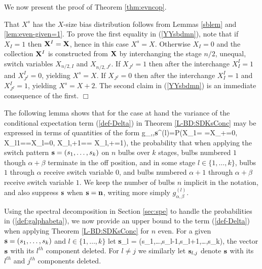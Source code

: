 \documentclass[10pt, amstex]{article}
\newcommand{\bbox}{\hfill $\Box$}
\begin{document}
We now present the proof of Theorem \ref{thm:evncop}.


\noindent \proof  That $X^s$ has the $X$-size bias distribution follows from Lemmas \ref{sblem} and \ref{lem:even-given=1}.
To prove the first equality in (\ref{YYsbdmn}), note that if $X_I=1$ then ${\bf X}^I={\bf X}$, hence in this case $X^s=X$.
Otherwise $X_I=0$ and the collection ${\bf X}^I$ is constructed from ${\bf X}$ by interchanging the stage $n/2$, unequal, switch variables $X_{n/2,I}$ and $X_{n/2,J^I}$. If $X_{J^I}=1$ then after the interchange $X_I^I=1$ and $X_{J^I}^I=0$, yielding $X^s=X$. If $X_{J^I}=0$ then after the interchange $X_I^I=1$ and $X_{J^I}^I=1$, yielding $X^s=X+2$. The second claim in (\ref{YYsbdmn}) is an immediate consequence of the first.
\bbox





The following lemma shows that for the case at hand the variance of
the conditional expectation term (\ref{def-Delta}) in Theorem
\ref{L-BD:SDKsConc} may be expressed in terms of quantities of the
form
\bea
\label{def:galphabeta}
g_{\alpha,\beta,{\bf s}}^{(l)}=P(X_1=
\cdots =X_{\alpha+\beta}=0, X_{l1}=\cdots =X_{l\alpha}=0,
X_{l,\alpha+1}=\cdots = X_{l,\alpha+\beta}=1),
\ena
the probability
that when applying the switch pattern ${\bf s}=(s_1,\ldots,s_k)$ on
$n$ bulbs over $k$ stages, bulbs numbered $1$ though $\alpha+\beta$
terminate in the off position, and in some stage $l \in \{1,\ldots,k\}$,
bulbs $1$ through $\alpha$ receive switch variable $0$, and bulbs
numbered $\alpha+1$ through $\alpha+\beta$ receive switch variable
$1$. We keep the number of bulbs $n$ implicit in the notation, and also suppress ${\bf s}$ when ${\bf s}={\bf n}$,
writing more simply $g_{\alpha,\beta}^{(l)}$.

Using the spectral decomposition in Section \ref{sec:spe} to handle
the probabilities in (\ref{def:galphabeta}), we now provide an upper bound to the
term (\ref{def-Delta}) when applying Theorem \ref{L-BD:SDKsConc} for $n$ even.
For a given ${\bf s}=(s_1,\ldots,s_k)$ and $l \in \{1,\ldots,k\}$ let
\bea
\label{sdell}
{\bf s}_l = (s_1,\ldots,s_{l-1},s_{l+1},\ldots,s_k),
\ena
the vector ${\bf s}$ with its $l^{th}$ component deleted. For $l \not = j$ we similarly let ${\bf s}_{l,j}$ denote
${\bf s}$ with its $l^{th}$ and $j^{th}$ components deleted.
\end{document}
